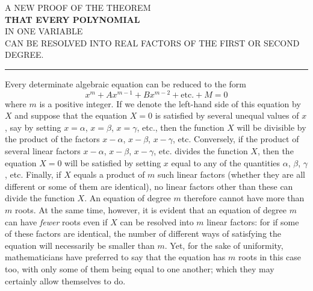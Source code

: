 \begin{center}\small
A NEW PROOF OF THE THEOREM\\[5pt]
\textbf{THAT EVERY POLYNOMIAL}\\[5pt]
IN ONE VARIABLE\\[5pt]
CAN BE RESOLVED INTO REAL FACTORS OF THE FIRST OR SECOND DEGREE.\\[8pt]
\rule{1.5cm}{0.3pt}
\end{center}
Every determinate algebraic equation can be reduced to the form
\[
x^m+Ax^{m-1}+Bx^{m-2}+\text{etc.}+M=0
\]
where $m$ is a positive integer. If we denote the left-hand side of this equation by $X$ and suppose that the equation $X=0$ is satisfied by several unequal values of $x$, say by setting $x=\alpha$, $x=\beta$, $x=\gamma$, etc., then the function $X$ will be divisible by the product of the factors $x-\alpha$, $x-\beta$, $x-\gamma$, etc. Conversely, if the product of several linear factors $x-\alpha$, $x-\beta$, $x-\gamma$, etc. divides the function $X$, then the equation $X=0$ will be satisfied by setting $x$ equal to any of the quantities $\alpha$, $\beta$, $\gamma$, etc. Finally, if $X$ equals a product of $m$ such linear factors (whether they are all different or some of them are identical), no linear factors other than these can divide the function $X$. An equation of degree $m$ therefore cannot have more than $m$ roots. At the same time, however, it is evident that an equation of degree $m$ can have \textit{fewer} roots even if $X$ can be resolved into $m$ linear factors: for if some of these factors are identical, the number of different ways of satisfying the equation will necessarily be smaller than $m$. Yet, for the sake of uniformity, mathematicians have preferred to say that the equation has $m$ roots in this case too, with only some of them being equal to one another; which they may certainly allow themselves to do.
